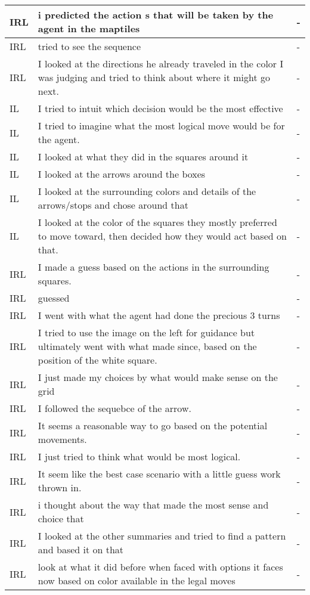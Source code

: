 \documentclass{article}
\begin{document}
\begin{longtable}{ | m{0.6in} | m{5in}| m{0.6in} | }
IRL & i predicted the action s that will be taken by the agent in the maptiles & - \\ \hline
IRL & tried to see the sequence & - \\ \hline
IRL & I looked at the directions he already traveled in the color I was judging and tried to think about where it might go next. & - \\ \hline
IL & I tried to intuit which decision would be the most effective & - \\ \hline
IL & I tried to imagine what the most logical move would be for the agent. & - \\ \hline
IL & I looked at what they did in the squares around it & - \\ \hline
IL & I looked at the arrows around the boxes & - \\ \hline
IL & I looked at the surrounding colors and details of the arrows/stops and chose around that & - \\ \hline
IL & I looked at the color of the squares they mostly preferred to move toward, then decided how they would act based on that. & - \\ \hline
IRL & I made a guess based on the actions in the surrounding squares. & - \\ \hline
IRL & guessed & - \\ \hline
IRL & I went with what the agent had done the precious 3 turns & - \\ \hline
IRL & I tried to use the image on the left for guidance but ultimately went with what made since, based on the position of the white square. & - \\ \hline
IRL & I just made my choices by what would make sense on the grid & - \\ \hline
IRL & I followed the sequebce of the arrow. & - \\ \hline
IRL & It seems a reasonable way to go based on the potential movements.  & - \\ \hline
IRL & I just tried to think what would be most logical. & - \\ \hline
IRL & It seem like the best case scenario with a little guess work thrown in. & - \\ \hline
IRL & i thought about the way that made the most sense and choice that & - \\ \hline
IRL & I looked at the other summaries and tried to find a pattern and based it on that & - \\ \hline
IRL & look at what it did before when faced with options it faces now based on color available in the legal moves & - \\ \hline

\end{longtable}
\end{document}
